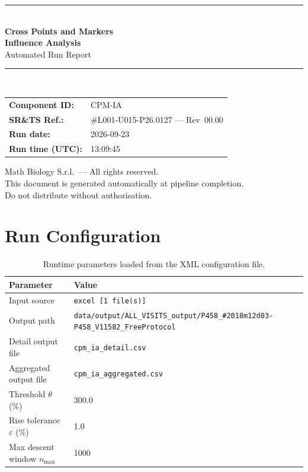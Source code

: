 \documentclass[a4paper,11pt]{article}
\begin{document}
\begin{titlepage}
\begin{center}
  \vspace*{1.8cm}
  {\color{dmaaccent}\rule{\linewidth}{1.5pt}}\\[0.6cm]
  {\LARGE\bfseries\color{dmaaccent}
    Cross Points and Markers\\[0.25cm]
    Influence Analysis}\\[0.4cm]
  {\Large Automated Run Report}\\[0.3cm]
  {\color{dmaaccent}\rule{\linewidth}{1.5pt}}\\[2cm]

  \begin{tabular}{ll}
    \textbf{Component ID:}   & CPM-IA \\[0.3cm]
    \textbf{SR\&TS Ref.:}    & \#L001-U015-P26.0127 --- Rev~00.00 \\[0.3cm]
    \textbf{Run date:}       & 2026-09-23 \\[0.3cm]
    \textbf{Run time (UTC):} & 13:09:45 \\
  \end{tabular}

  \vfill
  {\color{dmagray}\small
    Math Biology S.r.l.\ --- All rights reserved.\\
    This document is generated automatically at pipeline completion.\\
    Do not distribute without authorisation.}
\end{center}
\end{titlepage}

\tableofcontents
\clearpage

\section{Run Configuration}

\begin{table}[h!]
\centering
\small
\caption{Runtime parameters loaded from the XML configuration file.}
\begin{tabular}{ll}
\toprule
\textbf{Parameter} & \textbf{Value} \\
\midrule
Input source                      & \texttt{excel [1 file(s)]} \\
Output path                       & \texttt{data/output/ALL\_VISITS\_output/P458\_\#2018m12d03-P458\_V11582\_FreeProtocol} \\
Detail output file                & \texttt{cpm\_ia\_detail.csv} \\
Aggregated output file            & \texttt{cpm\_ia\_aggregated.csv} \\
Threshold $\theta$ (\%)           & 300.0 \\
Rise tolerance $\varepsilon$ (\%) & 1.0 \\
Max descent window $n_{\max}$     & 1000 \\
\bottomrule
\end{tabular}
\end{table}
\end{document}

